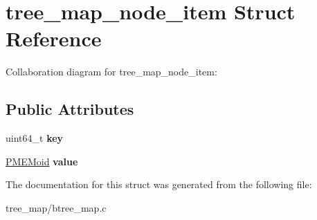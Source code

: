 \hypertarget{structtree__map__node__item}{}\section{tree\+\_\+map\+\_\+node\+\_\+item Struct Reference}
\label{structtree__map__node__item}


Collaboration diagram for tree\+\_\+map\+\_\+node\+\_\+item\+:
\subsection*{Public Attributes}
\begin{DoxyCompactItemize}
\item 
\mbox{\label{structtree__map__node__item_aae3b9854bf042bbbc5d8f787126cd012}} 
uint64\+\_\+t {\bfseries key}
\item 
\mbox{\label{structtree__map__node__item_aab442f5dff18d6bd004621ad55fa6d0f}} 
\hyperlink{structpmemoid}{P\+M\+E\+Moid} {\bfseries value}
\end{DoxyCompactItemize}


The documentation for this struct was generated from the following file\+:\begin{DoxyCompactItemize}
\item 
tree\+\_\+map/btree\+\_\+map.\+c\end{DoxyCompactItemize}
